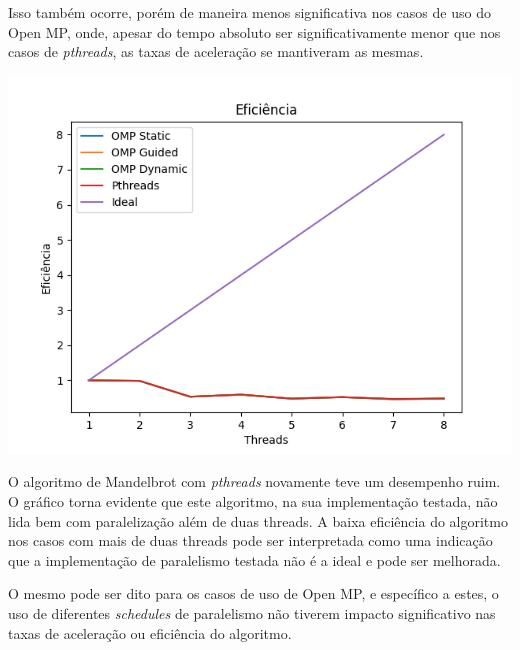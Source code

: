 \documentclass[10pt,a4paper]{article}
\begin{document}
		Isso também ocorre, porém de maneira menos significativa nos casos de uso do Open MP, onde, apesar do tempo absoluto ser significativamente
		menor que nos casos de \textit{pthreads}, as taxas de aceleração se mantiveram as mesmas.

		\includegraphics[scale=.7]{Eficiência.png}
		
		O algoritmo de Mandelbrot com \textit{pthreads} novamente teve um desempenho ruim. O gráfico torna evidente
		que este algoritmo, na sua implementação testada, não lida bem com paralelização além de duas threads.
		A baixa eficiência do algoritmo nos casos com mais de duas threads pode ser interpretada como uma indicação que
		a implementação de paralelismo testada não é a ideal e pode ser melhorada.

		O mesmo pode ser dito para os casos de uso de Open MP, e específico a estes, o uso de diferentes \textit{schedules} de paralelismo não
		tiverem impacto significativo nas taxas de aceleração ou eficiência do algoritmo.
\end{document}
